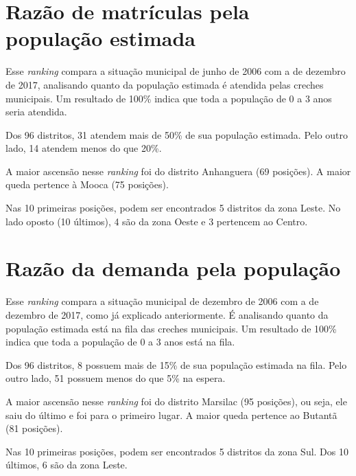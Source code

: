 \section{Razão de matrículas pela população estimada}

Esse \textit{ranking} compara a situação municipal de junho de 2006 com a de dezembro de 2017, analisando quanto da população estimada é atendida pelas creches municipais. Um resultado de 100\% indica que toda a população de 0 a 3 anos seria atendida.

Dos 96 distritos, 31 atendem mais de 50\% de sua população estimada. Pelo outro lado, 14 atendem menos do que 20\%. 

A maior ascensão nesse \textit{ranking} foi do distrito Anhanguera (69 posições). A maior queda pertence à Mooca (75 posições).

Nas 10 primeiras posições, podem ser encontrados 5 distritos da zona Leste. No lado oposto (10 últimos), 4 são da zona Oeste e 3 pertencem ao Centro.

\section{Razão da demanda pela população}

Esse \textit{ranking} compara a situação municipal de dezembro de 2006 com a de dezembro de 2017, como já explicado anteriormente. É analisando quanto da população estimada está na fila das creches municipais. Um resultado de 100\% indica que toda a população de 0 a 3 anos está na fila.

Dos 96 distritos, 8 possuem mais de 15\% de sua população estimada na fila. Pelo outro lado, 51 possuem menos do que 5\% na espera. 

A maior ascensão nesse \textit{ranking} foi do distrito Marsilac (95 posições), ou seja, ele saiu do último e foi para o primeiro lugar. A maior queda pertence ao Butantã (81 posições).

Nas 10 primeiras posições, podem ser encontrados 5 distritos da zona Sul. Dos 10 últimos, 6 são da zona Leste.